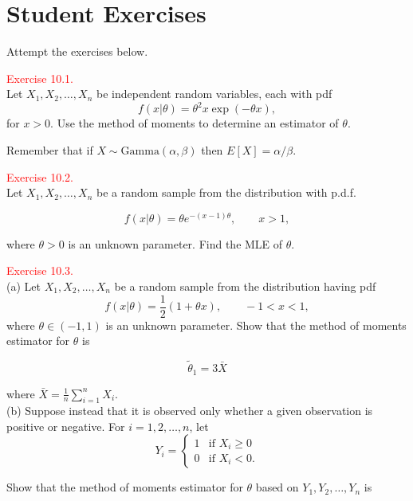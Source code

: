 \documentclass[
]{book}
\begin{document}
\hypertarget{MLE:exer}{%
\section*{\texorpdfstring{{\textbf{Student Exercises}}}{Student Exercises}}\label{MLE:exer}}

Attempt the exercises below.

\leavevmode{}%
\textcolor{red}{Exercise 10.1.}\\
Let \(X_1, X_2, \dots, X_n\) be independent random variables, each with pdf
\[ f(x | \theta) = \theta^2 x \exp(-\theta x),\]
for \(x > 0\). Use the method of moments to determine an estimator of \(\theta\).

Remember that if \(X \sim \text{Gamma}(\alpha,\beta)\) then \(E[X]=\alpha/\beta\).

\hfill\break

\hypertarget{exer10:2}{}
\textcolor{red}{Exercise 10.2.}\\
Let \(X_1, X_2, \dots, X_n\) be a random sample from the distribution with p.d.f.

\[ f(x|\theta) = \theta e^{-(x-1)\theta}, \qquad x>1,\]

where \(\theta > 0\) is an unknown parameter. Find the MLE of \(\theta\).

\hfill\break

\hypertarget{exer10:3}{}
\textcolor{red}{Exercise 10.3.}\\
(a) Let \(X_1, X_2, \dots, X_n\) be a random sample from the distribution having pdf
\[ f(x|\theta) = \frac{1}{2} (1+ \theta x), \qquad -1<x<1,\]
where \(\theta \in (-1,1)\) is an unknown parameter. Show that the method of moments estimator for \(\theta\) is

\[\tilde{\theta}_1 = 3 \bar{X}\]

where \(\bar{X} = \frac{1}{n} \sum_{i=1}^n X_i.\)\\
(b) Suppose instead that it is observed only whether a given observation is positive or negative. For \(i=1,2,\dots,n\), let\\

\[ Y_i = \begin{cases} 1 & \text{if } X_i \geq 0 \\ 0 & \text{if } X_i < 0. \end{cases} \]

Show that the method of moments estimator for \(\theta\) based on \(Y_1, Y_2, \dots, Y_n\) is\\
\end{document}
